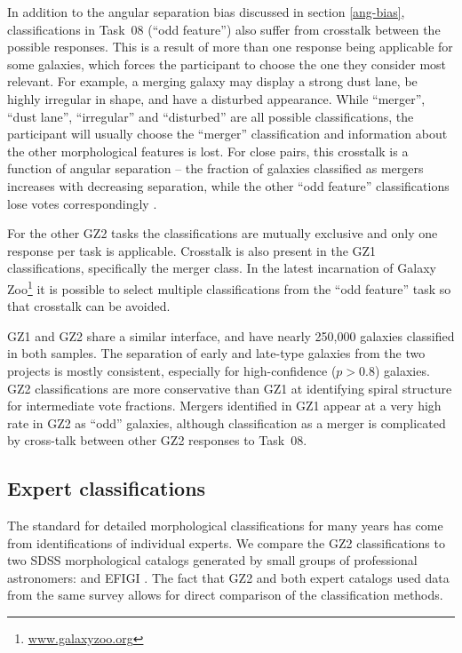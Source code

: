 \documentclass[useAMS,usenatbib]{mn2e}
\begin{document}
In addition to the angular separation bias discussed in section \ref{ang-bias}, classifications in Task~08 (``odd feature'') also suffer from crosstalk between the possible responses. This is a result of more than one response being applicable for some galaxies, which forces the participant to choose the one they consider most relevant. For example, a merging galaxy may display a strong dust lane, be highly irregular in shape, and have a disturbed appearance. While ``merger'', ``dust lane'', ``irregular'' and ``disturbed'' are all possible classifications, the participant will usually choose the ``merger'' classification and information about the other morphological features is lost. For close pairs, this crosstalk is a function of angular separation -- the fraction of galaxies classified as mergers increases with decreasing separation, while the other ``odd feature'' classifications lose votes correspondingly \citep{cas13}.

For the other GZ2 tasks the classifications are mutually exclusive and only one response per task is applicable. Crosstalk is also present in the GZ1 classifications, specifically the merger class. In the latest incarnation of Galaxy Zoo\footnote{\url{www.galaxyzoo.org}} it is possible to select multiple classifications from the ``odd feature'' task so that crosstalk can be avoided.

GZ1 and GZ2 share a similar interface, and have nearly 250,000 galaxies classified in both samples. The separation of early and late-type galaxies from the two projects is mostly consistent, especially for high-confidence ($p>0.8$) galaxies. GZ2 classifications are more conservative than GZ1 at identifying spiral structure for intermediate vote fractions. Mergers identified in GZ1 appear at a very high rate in GZ2 as ``odd'' galaxies, although classification as a merger is complicated by cross-talk between other GZ2 responses to Task~08. 

\subsection{Expert classifications}

The standard for detailed morphological classifications for many years has come from identifications of individual experts. We compare the GZ2 classifications to two SDSS morphological catalogs generated by small groups of professional astronomers: \citet[][hereafter NA10]{nai10} and EFIGI \citep{bai11}. The fact that GZ2 and both expert catalogs used data from the same survey allows for direct comparison of the classification methods.
\end{document}
